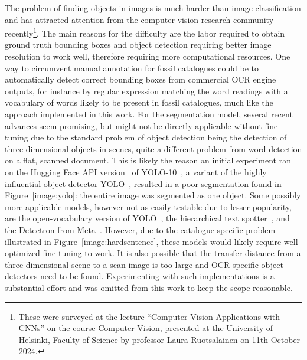 \documentclass[english,twoside,openright]{UH_DS_MSc}
\begin{document}
The problem of finding objects in images is much harder than image classification and has attracted attention 
from the computer vision research community recently\footnote{These were surveyed at the lecture ``Computer Vision Applications with CNNs'' on the course Computer Vision, presented at the University of Helsinki, Faculty of Science by professor Laura Ruotsalainen on 11th October 2024.}. 
The main reasons for the difficulty are the labor required to obtain ground truth bounding boxes and object detection requiring better image resolution to work well, therefore requiring more computational resources.
One way to circumvent manual annotation for fossil catalogues could be to automatically detect correct bounding boxes 
from commercial OCR engine outputs, for instance by regular expression matching the word readings with a vocabulary of words likely to be 
present in fossil catalogues, much like the approach implemented in this work.
For the segmentation model, several recent advances seem promising, but might not be directly applicable without fine-tuning 
due to the standard problem of object detection being the detection of three-dimensional objects in scenes,
quite a different problem from word detection on a flat, scanned document. This is likely the reason an initial experiment 
ran on the Hugging Face API version~\cite{OmouredYOLOv10DocumentLayoutAnalysisHugging2023} of YOLO-10~\cite{wang2024yolov10}, a variant of the highly influential object detector YOLO~\cite{redmonYouOnlyLook2016},
resulted in a poor segmentation found in Figure~\ref{image:yolo}: the entire image was segmented as one object.
Some possibly more applicable models, however not as easily testable due to lesser popularity, 
are the open-vocabulary version of YOLO~\cite{YOLOWorldRealTimeOpenVocabulary},
 the hierarchical text spotter~\cite{longHierarchicalTextSpotter2024}, and the Detectron from Meta~\cite{Detectron}.
 However, due to the catalogue-specific problem illustrated in Figure~\ref{image:hardsentence}, these 
 models would likely require well-optimized fine-tuning to work. It is also possible that the transfer distance from a three-dimensional scene to a scan image is 
 too large and OCR-specific object detectors need to be found. Experimenting with such implementations is a 
 substantial effort and was omitted from this work to keep the scope reasonable.
\end{document}
